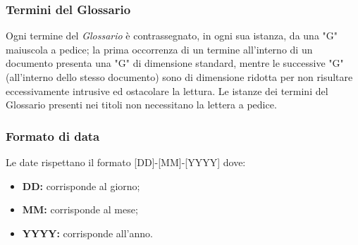 \subsubsection{Termini del Glossario}
Ogni termine del \textit{Glossario} è contrassegnato, in ogni sua istanza, da una "G" maiuscola a pedice; la prima occorrenza di un termine all'interno di un documento presenta una "G" di dimensione standard, mentre le successive "G" (all'interno dello stesso documento) sono di dimensione ridotta per non risultare eccessivamente intrusive ed ostacolare la lettura.
Le istanze dei termini del Glossario presenti nei titoli non necessitano la lettera a pedice.
\subsubsection{Formato di data}
Le date rispettano il formato
[DD]-[MM]-[YYYY] dove:
\begin{itemize}
  \item \textbf{DD:} corrisponde al giorno;
	\item \textbf{MM:} corrisponde al mese;
	\item \textbf{YYYY:} corrisponde all'anno.
\end{itemize}

